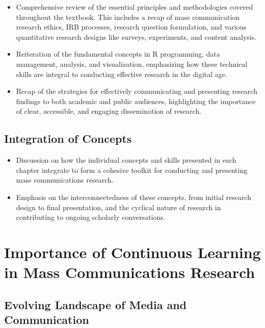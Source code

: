 \documentclass[
]{book}
\begin{document}
\begin{itemize}
\item
  Comprehensive review of the essential principles and methodologies covered throughout the textbook. This includes a recap of mass communication research ethics, IRB processes, research question formulation, and various quantitative research designs like surveys, experiments, and content analysis.
\item
  Reiteration of the fundamental concepts in R programming, data management, analysis, and visualization, emphasizing how these technical skills are integral to conducting effective research in the digital age.
\item
  Recap of the strategies for effectively communicating and presenting research findings to both academic and public audiences, highlighting the importance of clear, accessible, and engaging dissemination of research.
\end{itemize}

\hypertarget{integration-of-concepts}{%
\subsection*{Integration of Concepts}\label{integration-of-concepts}}

\begin{itemize}
\item
  Discussion on how the individual concepts and skills presented in each chapter integrate to form a cohesive toolkit for conducting and presenting mass communications research.
\item
  Emphasis on the interconnectedness of these concepts, from initial research design to final presentation, and the cyclical nature of research in contributing to ongoing scholarly conversations.
\end{itemize}

\hypertarget{importance-of-continuous-learning-in-mass-communications-research}{%
\section*{Importance of Continuous Learning in Mass Communications Research}\label{importance-of-continuous-learning-in-mass-communications-research}}

\hypertarget{evolving-landscape-of-media-and-communication}{%
\subsection*{Evolving Landscape of Media and Communication}\label{evolving-landscape-of-media-and-communication}}
\end{document}
